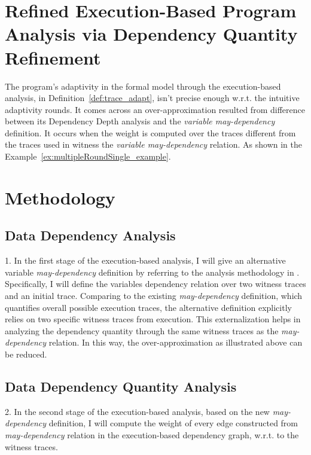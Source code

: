 \section{Refined Execution-Based Program Analysis via Dependency Quantity Refinement}
\label{sec:refine-exe}
%
The program's adaptivity in the formal model through the execution-based analysis,
in Definition~\ref{def:trace_adapt}, isn't precise enough w.r.t. the intuitive adaptivity rounds.
It comes across an over-approximation 
resulted from difference between its Dependency Depth analysis and the \emph{variable may-dependency} definition.
It occurs when the weight is computed over the traces different from the traces used in 
witness the \emph{variable may-dependency} relation.
As shown in the Example~\ref{ex:multipleRoundSingle_example}.

\section{ Methodology}
\label{sec:refine-exe-analysis}
% 

\subsection{Data Dependency Analysis}
\label{subsec:refine-exe-datadep}


1. In the first stage of the execution-based analysis, 
I will give an alternative variable \emph{may-dependency} definition 
by referring to the analysis methodology in \cite{Cousot19a}.
\\
Specifically, I will define the variables dependency relation over two witness traces and an initial trace. Comparing to 
the existing \emph{may-dependency} definition, which quantifies overall possible execution traces, the alternative
definition explicitly relies on two specific witness traces from execution.
This externalization helps in analyzing the dependency quantity through the same 
witness traces as the \emph{may-dependency} relation. In this way, the over-approximation as illustrated above
can be reduced.

\subsection{Data Dependency Quantity Analysis}
\label{subsec:refine-exe-reachability}
2. In the second stage of the execution-based analysis, 
based on the new \emph{may-dependency} definition,
I will compute the weight of every edge constructed from 
\emph{may-dependency} relation in the execution-based dependency graph, w.r.t. to the witness traces.
%

